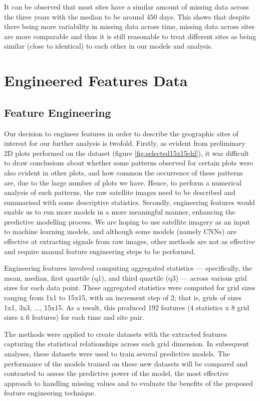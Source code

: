 \documentclass[a4paper,11pt]{report}
\begin{document}
It can be observed that most sites have a similar amount of missing data across the three years with the median to be around 450 days. This shows that despite there being more variability in missing data across time, missing data across sites are more comparable and thus it is still reasonable to treat different sites as being similar (close to identical) to each other in our models and analysis. 


\section{Engineered Features Data}
\subsection{Feature Engineering}

Our decision to engineer features in order to describe the geographic sites of interest for our further analysis is twofold. Firstly, as evident from preliminary 2D plots performed on the dataset (figure \ref{fig:selected15x15chl}), it was difficult to draw conclusions about whether some patterns observed for certain plots were also evident in other plots, and how common the occurrence of these patterns are, due to the large number of plots we have. Hence, to perform a numerical analysis of such patterns, the raw satellite images need to be described and summarised with some descriptive statistics. Secondly, engineering features would enable us to run more models in a more meaningful manner, enhancing the predictive modelling process. We are hoping to use satellite imagery as an input to machine learning models, and although some models (namely CNNs) are effective at extracting signals from raw images, other methods are not as effective and require manual feature engineering steps to be performed. 

Engineering features involved computing aggregated statistics — specifically, the mean, median, first quartile (q1), and third quartile (q3) — across various grid sizes for each data point. These aggregated statistics were computed for grid sizes ranging from 1x1 to 15x15, with an increment step of 2; that is, grids of sizes 1x1, 3x3, ..., 15x15. As a result, this produced 192 features (4 statistics x 8 grid sizes x 6 features) for each time and site pair.

The methods were applied to create datasets with the extracted features capturing the statistical relationships across each grid dimension. In subsequent analyses, these datasets were used to train several predictive models. The performance of the models trained on these new datasets will be compared and contrasted to assess the predictive power of the model, the most effective approach to handling missing values and to evaluate the benefits of the proposed feature engineering technique.
\end{document}
